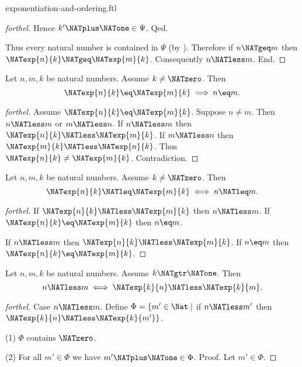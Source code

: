 \documentclass{naproche-library}
\begin{document}
\begin{smodule}[title=Exponentiation and Ordering]{exponentiation-and-ordering.ftl}
\begin{proof}[forthel]
      Hence $k' \NATplus \NATone \in \Psi$.
    Qed.

    Thus every natural number is contained in $\Psi$ (by ).
    Therefore if $n \NATgeq m$ then $\NATexp{n}{k} \NATgeq \NATexp{m}{k}$.
    Consequently $n \NATless m$.
  End.
\end{proof}

\begin{corollary}[forthel,id=ARITHMETIC_09_2797602550579200]
  Let $n, m, k$ be natural numbers.
  Assume $k \neq \NATzero$.
  Then \[ \NATexp{n}{k} \eq \NATexp{m}{k} \implies n \eq m. \]
\end{corollary}
\begin{proof}[forthel]
  Assume $\NATexp{n}{k} \eq \NATexp{m}{k}$.
  Suppose $n \neq m$.
  Then $n \NATless m$ or $m \NATless n$.
  If $n \NATless m$ then $\NATexp{n}{k} \NATless \NATexp{m}{k}$.
  If $m \NATless n$ then $\NATexp{m}{k} \NATless \NATexp{n}{k}$.
  Thus $\NATexp{n}{k} \neq \NATexp{m}{k}$.
  Contradiction.
\end{proof}

\begin{corollary}[forthel,id=ARITHMETIC_09_6875081963732992]
  Let $n, m, k$ be natural numbers.
  Assume $k \neq \NATzero$.
  Then \[ \NATexp{n}{k} \NATleq \NATexp{m}{k} \iff n \NATleq m. \]
\end{corollary}
\begin{proof}[forthel]
  If $\NATexp{n}{k} \NATless \NATexp{m}{k}$ then $n \NATless m$.
  If $\NATexp{n}{k} \eq \NATexp{m}{k}$ then $n \eq m$.

  If $n \NATless m$ then $\NATexp{n}{k} \NATless \NATexp{m}{k}$.
  If $n \eq m$ then $\NATexp{n}{k} \eq \NATexp{m}{k}$.
\end{proof}

\begin{proposition}[forthel,id=ARITHMETIC_09_3349764703780864]
  Let $n, m, k$ be natural numbers.
  Assume $k \NATgtr \NATone$.
  Then \[ n \NATless m \iff \NATexp{k}{n} \NATless \NATexp{k}{m}. \]
\end{proposition}
\begin{proof}[forthel]
  Case $n \NATless m$.
    Define $\Phi = \{ m' \in \Nat \mid$ if $n \NATless m'$ then $\NATexp{k}{n} \NATless \NATexp{k}{m'} \}$.

    (1) $\Phi$ contains $\NATzero$.

    (2) For all $m' \in \Phi$ we have $m' \NATplus \NATone \in \Phi$. \newline
    Proof.
      Let $m' \in \Phi$.


\end{proof}
\end{smodule}
\end{document}
